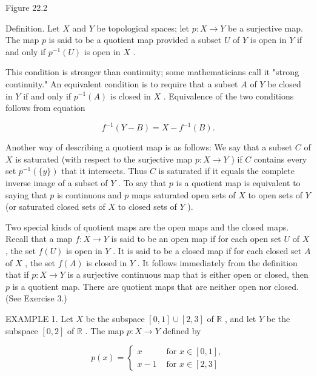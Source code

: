 Figure 22.2

Definition. Let \(X\) and \(Y\) be topological spaces; let \(p : X \rightarrow  Y\) be a surjective map. The map \(p\) is said to be a quotient map provided a subset \(U\) of \(Y\) is open in \(Y\) if and only if \({p}^{-1}\left( U\right)\) is open in \(X\) .

This condition is stronger than continuity; some mathematicians call it "strong continuity." An equivalent condition is to require that a subset \(A\) of \(Y\) be closed in \(Y\) if and only if \({p}^{-1}\left( A\right)\) is closed in \(X\) . Equivalence of the two conditions follows from equation

\[
{f}^{-1}\left( {Y - B}\right)  = X - {f}^{-1}\left( B\right) .
\]

Another way of describing a quotient map is as follows: We say that a subset \(C\) of \(X\) is saturated (with respect to the surjective map \(p : X \rightarrow  Y\) ) if \(C\) contains every set \({p}^{-1}\left( {\{ y\} }\right)\) that it intersects. Thus \(C\) is saturated if it equals the complete inverse image of a subset of \(Y\) . To say that \(p\) is a quotient map is equivalent to saying that \(p\) is continuous and \(p\) maps saturated open sets of \(X\) to open sets of \(Y\) (or saturated closed sets of \(X\) to closed sets of \(Y\) ).

Two special kinds of quotient maps are the open maps and the closed maps. Recall that a map \(f : X \rightarrow  Y\) is said to be an open map if for each open set \(U\) of \(X\) , the set \(f\left( U\right)\) is open in \(Y\) . It is said to be a closed map if for each closed set \(A\) of \(X\) , the set \(f\left( A\right)\) is closed in \(Y\) . It follows immediately from the definition that if \(p : X \rightarrow  Y\) is a surjective continuous map that is either open or closed, then \(p\) is a quotient map. There are quotient maps that are neither open nor closed. (See Exercise 3.)

EXAMPLE 1. Let \(X\) be the subspace \(\left\lbrack  {0,1}\right\rbrack   \cup  \left\lbrack  {2,3}\right\rbrack\) of \(\mathbb{R}\) , and let \(Y\) be the subspace \(\left\lbrack  {0,2}\right\rbrack\) of \(\mathbb{R}\) . The map \(p : X \rightarrow  Y\) defined by

\[
p\left( x\right)  = \left\{  \begin{array}{ll} x & \text{ for }x \in  \left\lbrack  {0,1}\right\rbrack  , \\  x - 1 & \text{ for }x \in  \left\lbrack  {2,3}\right\rbrack   \end{array}\right.
\]

